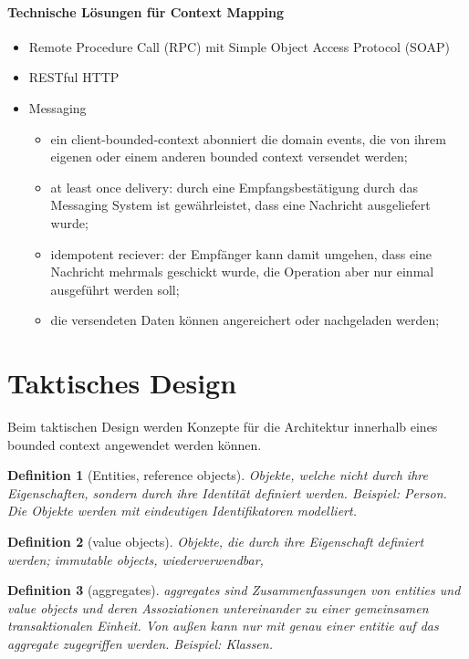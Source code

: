\documentclass[11pt,a4paper]{scrartcl}
\newtheorem{Def}{Definition}[section]
\begin{document}
\paragraph{Technische Lösungen für Context Mapping}
\begin{itemize}
	\item Remote Procedure Call (RPC) mit Simple Object Access Protocol (SOAP)
	\item RESTful HTTP
	\item Messaging
	\begin{itemize}
		\item ein client-bounded-context abonniert die domain events, die von ihrem eigenen oder einem anderen bounded context versendet werden;
		\item at least once delivery: durch eine Empfangsbestätigung durch das Messaging System ist gewährleistet, dass eine Nachricht ausgeliefert wurde;
		\item idempotent reciever: der Empfänger kann  damit umgehen, dass eine Nachricht mehrmals geschickt wurde, die Operation aber nur einmal ausgeführt werden soll;
		\item die versendeten Daten können angereichert oder nachgeladen werden;
	\end{itemize}
\end{itemize}

\section{Taktisches Design}

Beim taktischen Design werden Konzepte für die Architektur innerhalb eines bounded context angewendet werden können.

\begin{Def}[Entities, reference objects]
	Objekte, welche nicht durch ihre Eigenschaften, sondern durch ihre Identität definiert werden. Beispiel: Person. Die Objekte werden mit eindeutigen Identifikatoren modelliert.
\end{Def}

\begin{Def}[value objects]
	Objekte, die durch ihre Eigenschaft definiert werden; immutable objects, wiederverwendbar,
\end{Def}

\begin{Def}[aggregates]
	aggregates sind Zusammenfassungen von entities und value objects und deren Assoziationen untereinander zu einer gemeinsamen transaktionalen Einheit. Von außen kann nur mit genau einer entitie auf das aggregate zugegriffen werden. Beispiel: Klassen.
\end{Def}
\end{document}
